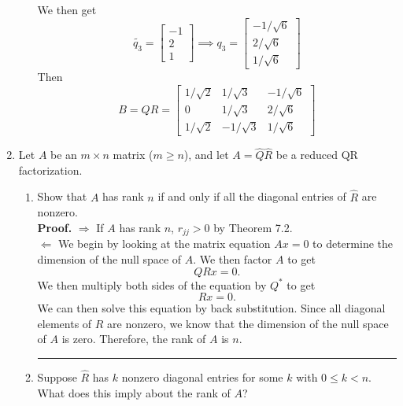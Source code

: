 \documentclass[12pt]{article}
\numberwithin{equation}{section}
\newenvironment{proof}[1][Proof]{\textbf{#1.} }{\ \rule{0.5em}{0.5em}}
\begin{document}
\begin{enumerate}
\begin{enumerate}
        We then get
        $$\tilde{q_3}=\left[\begin{array}{c}-1\\2\\1\end{array}\right]\implies q_3=\left[\begin{array}{c}-1/\sqrt{6}\\2/\sqrt{6}\\1/\sqrt{6}\end{array}\right]$$
        Then
        $$B=QR=\left[\begin{array}{ccc}1/\sqrt{2}&1/\sqrt{3}&-1/\sqrt{6}\\0&1/\sqrt{3}&2/\sqrt{6}\\1/\sqrt{2}&-1/\sqrt{3}&1/\sqrt{6}\end{array}\right]$$
    \end{enumerate}
\item Let $A$ be an $m\times n$ matrix ($m\geq n$), and let $A=\hat{Q}\hat{R}$ be a reduced QR factorization.
    \begin{enumerate}
    \item Show that $A$ has rank $n$ if and only if all the diagonal entries of $\hat{R}$ are nonzero.\\

        \begin{proof} $\Rightarrow$ If $A$ has rank $n$, $r_{jj}>0$ by Theorem 7.2.\\
        $\Leftarrow$ We begin by looking at the matrix equation $Ax=0$ to determine the dimension of the null space of $A$. We then factor $A$ to get
        $$QRx=0.$$
        We then multiply both sides of the equation by $Q^*$ to get
        $$Rx=0.$$
        We can then solve this equation by back substitution. Since all diagonal elements of $R$ are nonzero, we know that the dimension of the null space of $A$ is zero. Therefore, the rank of $A$ is $n$.
        \end{proof}
    \item Suppose $\hat{R}$ has $k$ nonzero diagonal entries for some $k$ with $0\leq k<n$. What does this imply about the rank of $A$?\\


\end{enumerate}
\end{enumerate}
\end{document}
